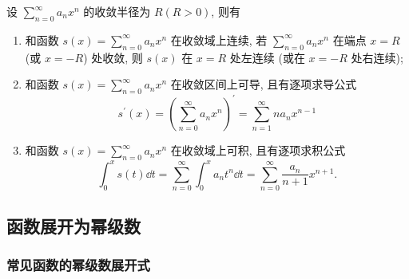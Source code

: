 \begin{theorem}[幂级数的性质]
    设 $\displaystyle \sum_{n=0}^{\infty} a_{n} x^{n} $ 的收敛半径为 $ R(R>0) $, 则有
    \begin{enumerate}[label=(\arabic{*})]
        \item 和函数 $\displaystyle s(x)=\sum_{n=0}^{\infty} a_{n} x^{n} $ 在收敛域上连续, 若 $\displaystyle \sum_{n=0}^{\infty} a_{n} x^{n} $ 在端点 $ x=R $ (或 $ x=-R$)  处收敛, 
              则 $ s(x) $ 在 $ x=R $ 处左连续 (或在 $ x=-R $ 处右连续);
        \item 和函数 $\displaystyle s(x)=\sum_{n=0}^{\infty} a_{n} x^{n} $ 在收敛区间上可导, 且有逐项求导公式
              $$s^{\prime}(x)=\left(\sum_{n=0}^{\infty} a_{n} x^{n}\right)^{\prime}=\sum_{n=1}^{\infty} n a_{n} x^{n-1} $$
        \item 和函数 $\displaystyle s(x)=\sum_{n=0}^{\infty} a_{n} x^{n} $ 在收敛域上可积, 且有逐项求积公式
              $$\int_{0}^{x}s(t)\dd t=\sum_{n=0}^{\infty}\int_{0}^{x}a_nt^n\dd t=\sum_{n=0}^{\infty}\dfrac{a_n}{n+1}x^{n+1}.$$
    \end{enumerate}
\end{theorem}

\subsection{函数展开为幂级数}

\subsubsection{常见函数的幂级数展开式}


